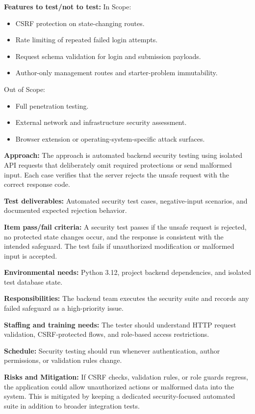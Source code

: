 \textbf{Features to test/not to test:}
In Scope:
\begin{itemize}
    \item CSRF protection on state-changing routes.
    \item Rate limiting of repeated failed login attempts.
    \item Request schema validation for login and submission payloads.
    \item Author-only management routes and starter-problem immutability.
\end{itemize}

Out of Scope:
\begin{itemize}
    \item Full penetration testing.
    \item External network and infrastructure security assessment.
    \item Browser extension or operating-system-specific attack surfaces.
\end{itemize}

\textbf{Approach:}
The approach is automated backend security testing using isolated API requests that deliberately omit required protections or send malformed input. Each case verifies that the server rejects the unsafe request with the correct response code.

\textbf{Test deliverables:}
Automated security test cases, negative-input scenarios, and documented expected rejection behavior.

\textbf{Item pass/fail criteria:}
A security test passes if the unsafe request is rejected, no protected state changes occur, and the response is consistent with the intended safeguard. The test fails if unauthorized modification or malformed input is accepted.

\textbf{Environmental needs:}
Python 3.12, project backend dependencies, and isolated test database state.

\textbf{Responsibilities:}
The backend team executes the security suite and records any failed safeguard as a high-priority issue.

\textbf{Staffing and training needs:}
The tester should understand HTTP request validation, CSRF-protected flows, and role-based access restrictions.

\textbf{Schedule:}
Security testing should run whenever authentication, author permissions, or validation rules change.

\textbf{Risks and Mitigation:}
If CSRF checks, validation rules, or role guards regress, the application could allow unauthorized actions or malformed data into the system. This is mitigated by keeping a dedicated security-focused automated suite in addition to broader integration tests.

